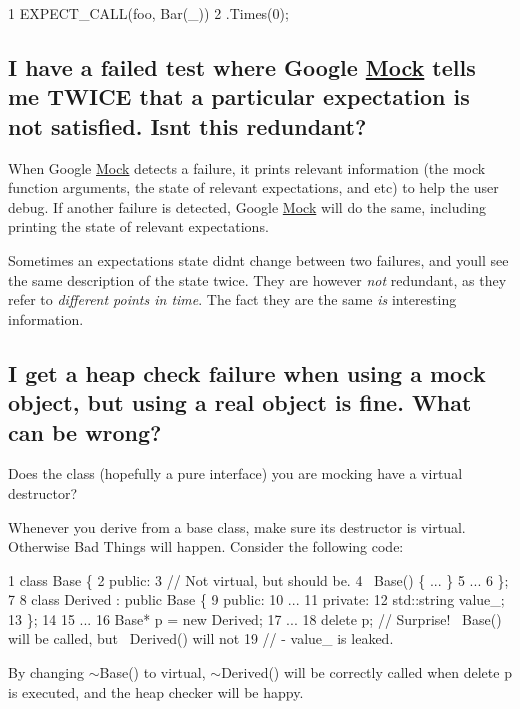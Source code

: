 \begin{DoxyCode}
1 EXPECT\_CALL(foo, Bar(\_))
2     .Times(0);
\end{DoxyCode}


\subsection*{I have a failed test where Google \hyperlink{class_mock}{Mock} tells me T\+W\+I\+CE that a particular expectation is not satisfied. Isn\textquotesingle{}t this redundant?}

When Google \hyperlink{class_mock}{Mock} detects a failure, it prints relevant information (the mock function arguments, the state of relevant expectations, and etc) to help the user debug. If another failure is detected, Google \hyperlink{class_mock}{Mock} will do the same, including printing the state of relevant expectations.

Sometimes an expectation\textquotesingle{}s state didn\textquotesingle{}t change between two failures, and you\textquotesingle{}ll see the same description of the state twice. They are however {\itshape not} redundant, as they refer to {\itshape different points in time}. The fact they are the same {\itshape is} interesting information.

\subsection*{I get a heap check failure when using a mock object, but using a real object is fine. What can be wrong?}

Does the class (hopefully a pure interface) you are mocking have a virtual destructor?

Whenever you derive from a base class, make sure its destructor is virtual. Otherwise Bad Things will happen. Consider the following code\+:


\begin{DoxyCode}
1 class Base \{
2  public:
3   // Not virtual, but should be.
4   ~Base() \{ ... \}
5   ...
6 \};
7 
8 class Derived : public Base \{
9  public:
10   ...
11  private:
12   std::string value\_;
13 \};
14 
15 ...
16   Base* p = new Derived;
17   ...
18   delete p;  // Surprise! ~Base() will be called, but ~Derived() will not
19              // - value\_ is leaked.
\end{DoxyCode}


By changing {\ttfamily $\sim$\+Base()} to virtual, {\ttfamily $\sim$\+Derived()} will be correctly called when {\ttfamily delete p} is executed, and the heap checker will be happy.

